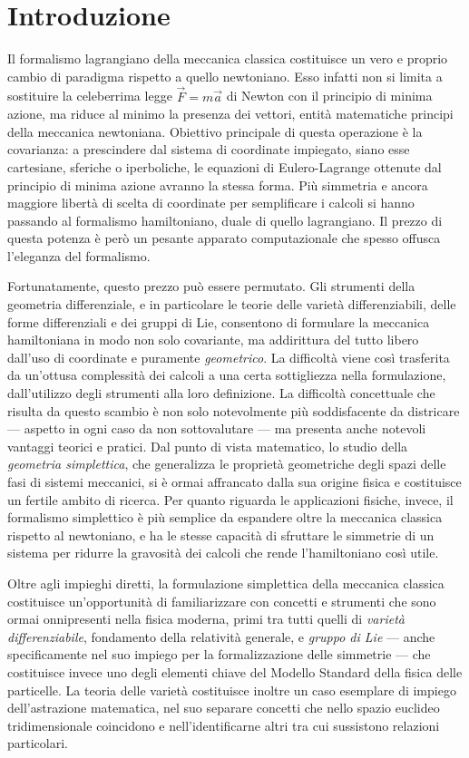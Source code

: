 \chapter*{Introduzione} 

Il formalismo lagrangiano della meccanica classica costituisce un vero e proprio cambio di paradigma rispetto a quello newtoniano. Esso infatti non si limita a sostituire la celeberrima legge $\vec{F}=m\vec{a}$ di Newton con il principio di minima azione, ma riduce al minimo la presenza dei vettori, entità matematiche principi della meccanica newtoniana. Obiettivo principale di questa operazione è la covarianza: a prescindere dal sistema di coordinate impiegato, siano esse cartesiane, sferiche o iperboliche, le equazioni di Eulero-Lagrange ottenute dal principio di minima azione avranno la stessa forma. Più simmetria e ancora maggiore libertà di scelta di coordinate per semplificare i calcoli si hanno passando al formalismo hamiltoniano, duale di quello lagrangiano. Il prezzo di questa potenza è però un pesante apparato computazionale che spesso offusca l'eleganza del formalismo.

Fortunatamente, questo prezzo può essere permutato. Gli strumenti della geometria differenziale, e in particolare le teorie delle varietà differenziabili, delle forme differenziali e dei gruppi di Lie, consentono di formulare la meccanica hamiltoniana in modo non solo covariante, ma addirittura del tutto libero dall'uso di coordinate e puramente \emph{geometrico}. La difficoltà viene così trasferita da un'ottusa complessità dei calcoli a una certa sottigliezza nella formulazione, dall'utilizzo degli strumenti alla loro definizione. La difficoltà concettuale che risulta da questo scambio è non solo notevolmente più soddisfacente da districare --- aspetto in ogni caso da non sottovalutare --- ma presenta anche notevoli vantaggi teorici e pratici. Dal punto di vista matematico, lo studio della \emph{geometria simplettica}, che generalizza le proprietà geometriche degli spazi delle fasi di sistemi meccanici, si è ormai affrancato dalla sua origine fisica e costituisce un fertile ambito di ricerca. Per quanto riguarda le applicazioni fisiche, invece, il formalismo simplettico è più semplice da espandere oltre la meccanica classica rispetto al newtoniano, e ha le stesse capacità di sfruttare le simmetrie di un sistema per ridurre la gravosità dei calcoli che rende l'hamiltoniano così utile.

Oltre agli impieghi diretti, la formulazione simplettica della meccanica classica costituisce un'opportunità di familiarizzare con concetti e strumenti che sono ormai onnipresenti nella fisica moderna, primi tra tutti quelli di \emph{varietà differenziabile}, fondamento della relatività generale, e \emph{gruppo di Lie} --- anche specificamente nel suo impiego per la formalizzazione delle simmetrie --- che costituisce invece uno degli elementi chiave del Modello Standard della fisica delle particelle. La teoria delle varietà costituisce inoltre un caso esemplare di impiego dell'astrazione matematica, nel suo separare concetti che nello spazio euclideo tridimensionale coincidono e nell'identificarne altri tra cui sussistono relazioni particolari.

